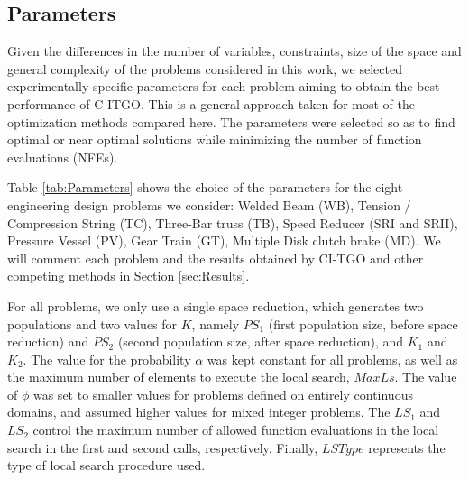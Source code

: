 \subsection{Parameters}

Given the differences in the number of variables, constraints, size of the space and general complexity of the problems considered in this work, we selected experimentally specific parameters for each problem aiming to obtain the best performance of C-ITGO. This is a general approach taken for most of the optimization methods compared here. The parameters were selected so as to find optimal or near optimal solutions while minimizing the number of function evaluations (NFEs).

Table \ref{tab:Parameters} shows the choice of the parameters for the eight engineering design problems we consider: Welded Beam (WB), Tension / Compression String (TC), Three-Bar truss (TB), Speed Reducer (SRI and SRII), Pressure Vessel (PV), Gear Train (GT), Multiple Disk clutch brake (MD). We will comment each problem and the results obtained by CI-TGO and other competing methods in Section \ref{sec:Results}.



For all problems, we only use a single space reduction, which generates two populations and two values for $K$, namely $PS_1$ (first population size, before space reduction) and $PS_2$ (second population size, after space reduction), and $K_1$ and $K_2$. The value for the probability $\alpha$ was kept constant for all problems, as well as the maximum number of elements to execute the local search, $MaxLs$. The value of $\phi$ was set to smaller values for problems defined on entirely continuous domains, and assumed higher values for mixed integer problems. The $LS_1$ and $LS_2$ control the maximum number of allowed function evaluations in the local search in the first and second calls, respectively. Finally, $LSType$ represents the type of local search procedure used. %